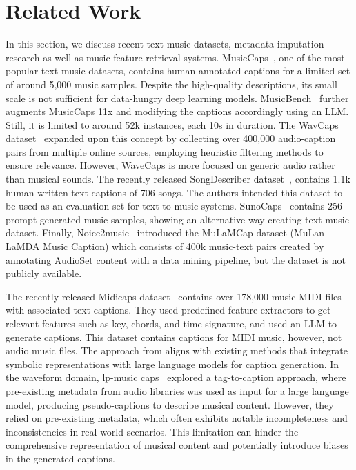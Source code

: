 \section{Related Work}
In this section, we discuss recent text-music datasets, metadata imputation research as well as music feature retrieval systems. MusicCaps~\cite{2023musiclm}, one of the most popular text-music datasets, contains human-annotated captions for a limited set of around 5,000 music samples. Despite the high-quality descriptions, its small scale is not sufficient for data-hungry deep learning models. MusicBench~\cite{melechovsky2023mustango} further augments MusicCaps 11x and modifying the captions accordingly using an LLM. Still, it is limited to around 52k instances, each 10s in duration. The WavCaps dataset~\cite{2023wavcaps} expanded upon this concept by collecting over 400,000 audio-caption pairs from multiple online sources, employing heuristic filtering methods to ensure relevance. However, WaveCaps is more focused on generic audio rather than musical sounds. The recently released SongDescriber dataset~\cite{manco2023song}, contains 1.1k human-written text captions of 706 songs. The authors intended this dataset to be used as an evaluation set for text-to-music systems. SunoCaps~\cite{2024sunocaps} contains 256 prompt-generated music samples, showing an alternative way creating text-music dataset. Finally, Noice2music~\cite{huang2023noise2music} introduced the MuLaMCap dataset (MuLan-LaMDA Music Caption) which consists of 400k music-text pairs created by annotating AudioSet content with a data mining pipeline, but the dataset is not publicly available. 

The recently released Midicaps dataset~\cite{Melechovsky2024} contains over 178,000 music MIDI files with associated text captions. They used predefined feature extractors to get relevant features such as key, chords, and time signature, and used an LLM to generate captions. This dataset contains captions for MIDI music, however, not audio music files. The approach from  \cite{Melechovsky2024} aligns with existing methods that integrate symbolic representations with large language models for caption generation. In the waveform domain, lp-music caps~\cite{2023lpmusiccaps} explored a tag-to-caption approach, where pre-existing metadata from audio libraries was used as input for a large language model, producing pseudo-captions to describe musical content. However, they relied on pre-existing metadata, which often exhibits notable incompleteness and inconsistencies in real-world scenarios. This limitation can hinder the comprehensive representation of musical content and potentially introduce biases in the generated captions.

